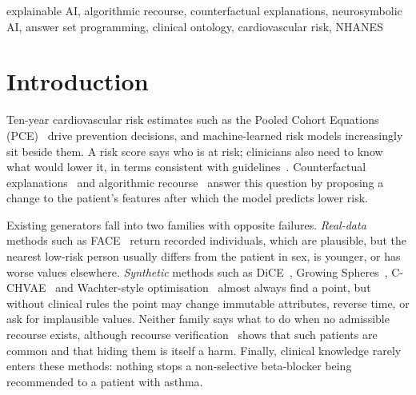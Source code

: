 \documentclass[conference]{IEEEtran}
\begin{document}
\begin{IEEEkeywords}
explainable AI, algorithmic recourse, counterfactual explanations, neurosymbolic AI, answer set programming, clinical ontology, cardiovascular risk, NHANES
\end{IEEEkeywords}

\section{Introduction}
Ten-year cardiovascular risk estimates such as the Pooled Cohort Equations (PCE)~\cite{goff2014pce} drive prevention decisions, and machine-learned risk models increasingly sit beside them. A risk score says who is at risk; clinicians also need to know what would lower it, in terms consistent with guidelines~\cite{tonekaboni2019clinicians}. Counterfactual explanations~\cite{wachter2018counterfactual} and algorithmic recourse~\cite{ustun2019actionable,karimi2022survey} answer this question by proposing a change to the patient's features after which the model predicts lower risk.

Existing generators fall into two families with opposite failures. \emph{Real-data} methods such as FACE~\cite{poyiadzi2020face} return recorded individuals, which are plausible, but the nearest low-risk person usually differs from the patient in sex, is younger, or has worse values elsewhere. \emph{Synthetic} methods such as DiCE~\cite{mothilal2020dice}, Growing Spheres~\cite{laugel2018growing}, C-CHVAE~\cite{pawelczyk2020cchvae} and Wachter-style optimisation~\cite{wachter2018counterfactual} almost always find a point, but without clinical rules the point may change immutable attributes, reverse time, or ask for implausible values. Neither family says what to do when no admissible recourse exists, although recourse verification~\cite{kothari2024reach} shows that such patients are common and that hiding them is itself a harm. Finally, clinical knowledge rarely enters these methods: nothing stops a non-selective beta-blocker being recommended to a patient with asthma.
\end{document}
